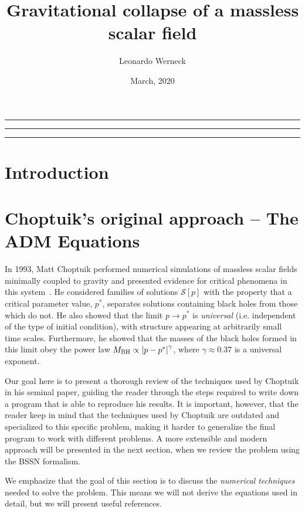 \documentclass[a4paper,11pt]{article}
\title{Gravitational collapse of a massless scalar field}
\author{Leonardo Werneck}
\date{March, 2020}
\newcommand{\g}{\gamma}
\renewcommand{\S}{\mathcal{S}}
\newcommand{\lrsquare}[1]{\left[ #1 \right]}
\newcommand{\abs}[1]{\left| #1 \right|}
\newcommand{\ctr}[1]{
  \begin{center}
    #1
  \end{center}
}
\begin{document}
\maketitle

\ctr{\rule{\textwidth}{1pt}}
\tableofcontents
\ctr{\rule{\textwidth}{1pt}}
\listoffigures
\ctr{\rule{\textwidth}{1pt}}


\section{Introduction}

\section{Choptuik's original approach -- The ADM Equations}

In 1993, Matt Choptuik performed numerical simulations of massless scalar fields minimally coupled to gravity and presented evidence for critical phenomena in this system~\cite{PhysRevLett.70.9}. He considered families of solutions $\S\lrsquare{p}$ with the property that a critical parameter value, $p^{*}$, separates solutions containing black holes from those which do not. He also showed that the limit $p\to p^{*}$ is \emph{universal} (i.e. independent of the type of initial condition), with structure appearing at arbitrarily small time scales. Furthermore, he showed that the masses of the black holes formed in this limit obey the power law $M_{\rm BH} \propto \abs{p-p^{*}}^{\g}$, where $\g\approx0.37$ is a universal exponent.

Our goal here is to present a thorough review of the techniques used by Choptuik in his seminal paper, guiding the reader through the steps required to write down a program that is able to reproduce his results. It is important, however, that the reader keep in mind that the techniques used by Choptuik are outdated and specialized to this specific problem, making it harder to generalize the final program to work with different problems. A more extensible and modern approach will be presented in the next section, when we review the problem using the BSSN formalism.

We emphasize that the goal of this section is to discuss the \emph{numerical techniques} needed to solve the problem. This means we will not derive the equations used in detail, but we will present useful references.
\end{document}
